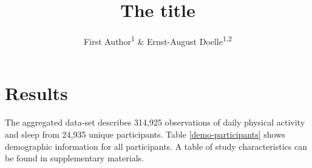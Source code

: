 \documentclass[
  man]{apa6}
\title{The title}
\author{First Author\textsuperscript{1} \& Ernst-August Doelle\textsuperscript{1,2}}
\date{}
\affiliation{\vspace{0.5cm}\textsuperscript{1} Wilhelm-Wundt-University\\\textsuperscript{2} Konstanz Business School}
\begin{document}
\maketitle

\renewcommand{\arraystretch}{0.65}

\hypertarget{results}{%
\section{Results}\label{results}}

The aggregated data-set describes 314,925 observations of daily physical activity and sleep from 24,935 unique participants. Table \ref{demo-participants} shows demographic information for all participants. A table of study characteristics can be found in supplementary materials.
\end{document}
